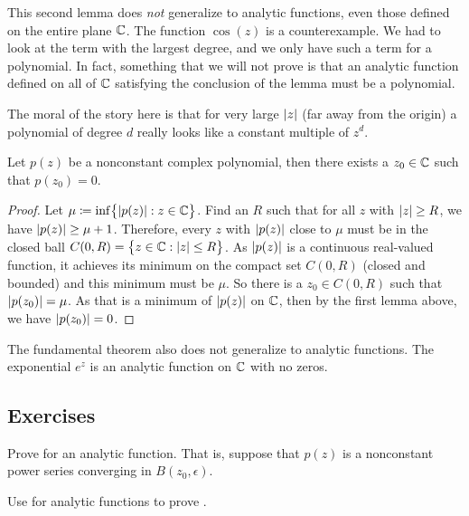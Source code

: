 This second lemma does \emph{not} generalize to analytic
functions, even those defined on the entire plane ${\mathbb{C}}$.  The function
$\cos(z)$ is a counterexample.
We had to look
at the term with the largest degree, and we only have such a term for
a polynomial.  In fact, something that we will not prove is that
an analytic function defined on all of ${\mathbb{C}}$ satisfying the conclusion
of the lemma must be a polynomial.

The moral of the story here is that for very large $\lvert {z} \rvert$ (far away from
the origin) a polynomial of degree $d$ really looks like a constant multiple
of $z^d$.

\begin{thm}
%
Let $p(z)$ be a nonconstant complex polynomial, then there exists a $z_0 \in {\mathbb{C}}$
such that $p(z_0) = 0$.
\end{thm}

\begin{proof}
Let $\mu \coloneqq \inf \bigl\{ \lvert {p(z)} \rvert : z \in {\mathbb{C}} \bigr\}$.  Find an $R$ such that
for all $z$ with $\lvert {z} \rvert \geq R$, we have $\lvert {p(z)} \rvert \geq \mu+1$.
Therefore, every $z$ with $\lvert {p(z)} \rvert$ close to $\mu$ must be in the
closed ball $C(0,R) = \bigl\{ z \in {\mathbb{C}} : \lvert {z} \rvert \leq R \bigr\}$.  As $\lvert {p(z)} \rvert$
is a continuous real-valued function, it achieves its minimum
on the compact set $C(0,R)$ (closed and bounded) and this minimum must
be $\mu$.  So there is a $z_0 \in C(0,R)$ such that $\lvert {p(z_0)} \rvert = \mu$.
As that is a minimum of $\lvert {p(z)} \rvert$ on ${\mathbb{C}}$, then by the first lemma
above, we have $\lvert {p(z_0)} \rvert = 0$.
\end{proof}

The fundamental theorem also does not generalize to analytic functions.  The
exponential $e^{z}$ is an analytic function on ${\mathbb{C}}$ with no zeros.

\subsection{Exercises}

\begin{exercise} \label{exercise:minprinciple}
Prove  for an analytic function.  That
is, suppose that $p(z)$ is a nonconstant power series converging in
$B(z_0,\epsilon)$.
\end{exercise}

\begin{exercise} \label{exercise:maxprinciple}
Use  for analytic functions to prove .
\end{exercise}


